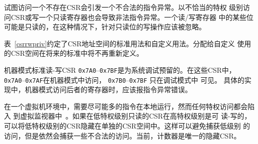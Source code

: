 
试图访问一个不存在CSR会引发一个不合法的指令异常。以不恰当的特权
级别访问CSR或写一个只读寄存器也会导致非法指令异常。一个读/写寄存器
中的某些位可能是只读的，在这种情况下，针对只读位的写操作应该被忽略。


表~\ref{csrrwpriv}约定了CSR地址空间的标准用法和自定义用法。分配给自定义
使用的CSR空间在将来的标准中将不再重新定义。


机器模式标准读-写CSR {\tt 0x7A0}--{\tt 0x7BF}是为系统调试预留的。在这些CSR中，
 {\tt 0x7A0}--{\tt 0x7AF}在机器模式中访问， {\tt 0x7B0}--{\tt 0x7BF} 只在调试模式中
 可见。 具体的实现中，机器模式访问后者的寄存器时，应该报指令异常错误。

\begin{commentary}

在一个虚拟机环境中，需要尽可能多的指令在本地运行，然而任何特权访问都会陷入
到虚拟监视器中~\cite{goldbergvm}。如果在低特权级别只读的CSR在高特权级别是可
读-写的，可以将低特权级别的CSR隐藏在单独的CSR空间中。这样可以避免捕获低级别
的访问，但是依然会捕获一些不合法的访问。当前，计数器是唯一的隐藏CSR。


\end{commentary}

